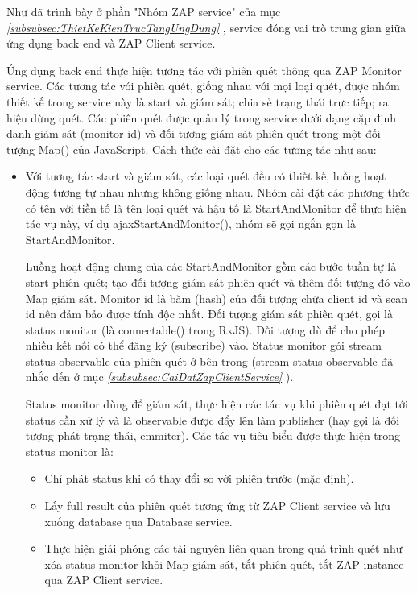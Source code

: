 \tab Như đã trình bày ở phần "Nhóm ZAP service" của mục \textit{\ref{subsubsec:ThietKeKienTrucTangUngDung} }, service đóng vai trò trung gian giữa ứng dụng back end và ZAP Client service.

Ứng dụng back end thực hiện tương tác với phiên quét thông qua ZAP Monitor service.
Các tương tác với phiên quét, giống nhau với mọi loại quét, được nhóm thiết kế trong service này là start và giám sát; chia sẻ trạng thái trực tiếp; ra hiệu dừng quét.
Các phiên quét được quản lý trong service dưới dạng cặp định danh giám sát (monitor id) và đối tượng giám sát phiên quét trong một đối tượng Map() của JavaScript.
Cách thức cài đặt cho các tương tác như sau:

\begin{itemize}
  \item Với tương tác start và giám sát, các loại quét đều có thiết kế, luồng hoạt động tương tự nhau nhưng không giống nhau.
        Nhóm cài đặt các phương thức có tên với tiền tố là tên loại quét và hậu tố là StartAndMonitor để thực hiện tác vụ này, ví dụ ajaxStartAndMonitor(), nhóm sẽ gọi ngắn gọn là StartAndMonitor.

        Luồng hoạt động chung của các StartAndMonitor gồm các bước tuần tự là start phiên quét; tạo đối tượng giám sát phiên quét và thêm đối tượng đó vào Map giám sát.
        Monitor id là băm (hash) của đối tượng chứa client id và scan id nên đảm bảo được tính độc nhất.
        Đối tượng giám sát phiên quét, gọi là status monitor (là connectable() trong RxJS).
        Đối tượng dù để cho phép nhiều kết nối có thể đăng ký (subscribe) vào.
        Status monitor gói stream status observable của phiên quét ở bên trong (stream status observable đã nhắc đến ở mục \textit{\ref{subsubsec:CaiDatZapClientService} }).

        Status monitor dùng để giám sát, thực hiện các tác vụ khi phiên quét đạt tới status cần xử lý và là observable được đẩy lên làm publisher (hay gọi là đối tượng phát trạng thái, emmiter).
        Các tác vụ tiêu biểu được thực hiện trong status monitor là:
        \begin{itemize}
          \item Chỉ phát status khi có thay đổi so với phiên trước (mặc định).
          \item Lấy full result của phiên quét tương ứng từ ZAP Client service và lưu xuống database qua Database service.
          \item Thực hiện giải phóng các tài nguyên liên quan trong quá trình quét như xóa status monitor khỏi Map giám sát, tắt phiên quét, tắt ZAP instance qua ZAP Client service.
        \end{itemize}


\end{itemize}

